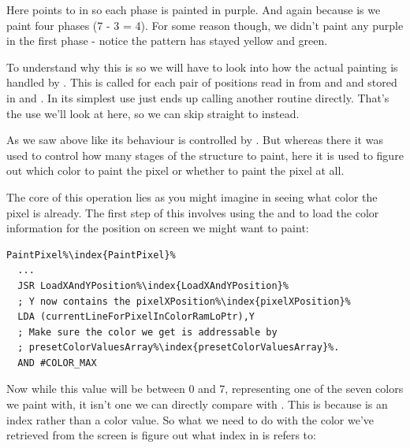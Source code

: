 Here  points to  in  so each phase is painted in purple. And again
because  is  we paint four phases (7 - 3 = 4). For some reason though, we
didn't paint any purple in the first phase - notice the pattern has stayed yellow and green.  


To understand why this is so we will have to look into how the actual painting is handled by . This is called for each pair of positions read
in from  and  and stored in  and .
In its simplest use  just ends up calling another routine  directly.
That's the use we'll look at here, so we can skip straight to  instead.

As we saw above like 
its behaviour is controlled by . But whereas there it was used to control how many
stages of the structure to paint, here it is used to figure out which color to paint the pixel or whether to paint the pixel 
at all.

The core of this operation lies as you might imagine in seeing what color the pixel is already. The first step of this involves
using the  and  to load the color information for the position on screen we might 
want to paint: 

\begin{lstlisting}[escapechar=\%]
PaintPixel%\index{PaintPixel}%   
  ...
  JSR LoadXAndYPosition%\index{LoadXAndYPosition}%
  ; Y now contains the pixelXPosition%\index{pixelXPosition}%
  LDA (currentLineForPixelInColorRamLoPtr),Y
  ; Make sure the color we get is addressable by
  ; presetColorValuesArray%\index{presetColorValuesArray}%.
  AND #COLOR_MAX
\end{lstlisting}

Now while this value will be between 0 and 7, representing one of the seven colors we paint with, it isn't one we can directly
compare with . This is because  is an index rather
than a color value. So what we need to do with the color we've retrieved from the screen is figure out what index in 
 is refers to:

